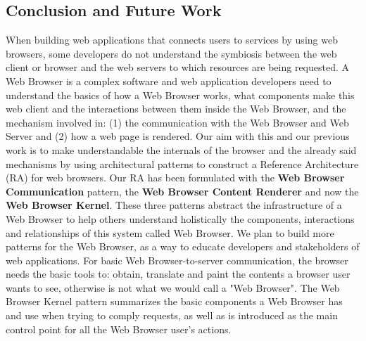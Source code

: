 \documentclass[prodmode,hillsideplop]{acmlarge}
\begin{document}
\subsection{Conclusion and Future Work}
When building web applications that connects users to services by using web browsers, some developers do not understand the symbiosis between the web client or browser and the web servers to which resources are being requested. %
A Web Browser is a complex software and web application developers need to understand the basics of how a Web Browser works, what components make this web client and the interactions between them inside the Web Browser, and the mechanism involved in: (1) the communication with the Web Browser and Web Server and (2) how a web page is rendered. Our aim with this and our previous work is to make understandable the internals of the browser and the already said mechanisms by using architectural patterns to construct a Reference Architecture (RA) for web browsers. Our RA has been formulated with the \textbf{Web Browser Communication} pattern, the \textbf{Web Browser Content Renderer} and now the \textbf{Web Browser Kernel}. These three patterns abstract the infrastructure of a Web Browser to help others understand holistically the components, interactions and relationships of this system called Web Browser. We plan to build more patterns for the Web Browser, as a way to educate developers and stakeholders of web applications. 
For basic Web Browser-to-server communication, the browser needs the basic tools to: obtain, translate and paint the contents a browser user wants to see, otherwise is not what we would call a "Web Browser". The Web Browser Kernel pattern summarizes the basic components a Web Browser has and use when trying to comply requests, as well as is introduced as the main control point for all the Web Browser user's actions. 
\end{document}
